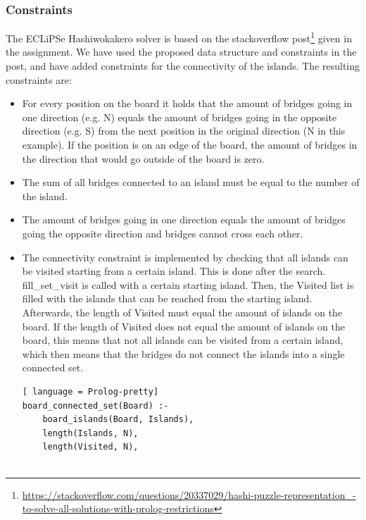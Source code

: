\documentclass{report}
\begin{document}
\subsubsection{Constraints}
The ECLiPSe Hashiwokakero solver is based on the stackoverflow post\footnote{\url{https://stackoverflow.com/questions/20337029/hashi-puzzle-representation\_-to-solve-all-solutions-with-prolog-restrictions}} given in the assignment. We have used the proposed data structure and constraints in the post, and have added constraints for the connectivity of the islands. The resulting constraints are:
\begin{itemize}
	\item For every position on the board it holds that the amount of bridges going in one direction (e.g. N) equals the amount of bridges going in the opposite direction (e.g. S) from the next position in the original direction (N in this example). If the position is on an edge of the board, the amount of bridges in the direction that would go outside of the board is zero.

        

    \item The sum of all bridges connected to an island must be equal to the number of the island.
        

    \item The amount of bridges going in one direction equals the amount of bridges going the opposite direction and bridges cannot cross each other.
        

    \item The connectivity constraint is implemented by checking that all islands can be visited starting from a certain island. This is done after the search. fill\_set\_visit is called with a certain starting island. Then, the Visited list is filled with the islands that can be reached from the starting island. Afterwards, the length of Visited must equal the amount of islands on the board. If the length of Visited does not equal the amount of islands on the board, this means that not all islands can be visited from a certain island, which then means that the bridges do not connect the islands into a single connected set.
\begin{lstlisting}[ language = Prolog-pretty]
board_connected_set(Board) :-
    board_islands(Board, Islands),
    length(Islands, N),
    length(Visited, N),


\end{lstlisting}
\end{itemize}
\end{document}
